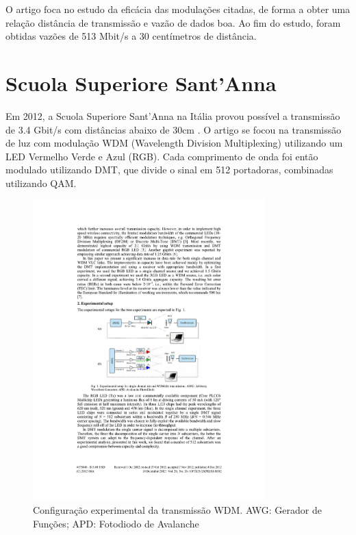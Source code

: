 	O artigo foca no estudo da eficácia das modulações citadas, de forma a obter uma relação distância de transmissão e vazão de dados boa. Ao fim do estudo, foram obtidas vazões de 513 Mbit/s a 30 centímetros de distância. 

	\section{Scuola Superiore Sant’Anna}\label{section:sant-ana}
	
	Em 2012, a Scuola Superiore Sant’Anna na Itália provou possível a transmissão de 3.4 Gbit/s com distâncias abaixo de 30cm \cite{3.4g-sant-ana}. O artigo se focou na transmissão de luz com modulação WDM (Wavelength Division Multiplexing) utilizando um LED Vermelho Verde e Azul (RGB). Cada comprimento de onda foi então modulado utilizando DMT, que divide o sinal em 512 portadoras, combinadas utilizando QAM.
	
	\begin{figure}[h]
		\caption{\label{figure:santanna-architecture}Configuração experimental da transmissão WDM. AWG: Gerador de Funções; APD: Fotodiodo de Avalanche}
		\centering
		\includegraphics[width=0.8\textwidth, trim={6.6cm 11cm 5cm 13.5cm},clip]{sant-ana.pdf}
	\end{figure}
	
